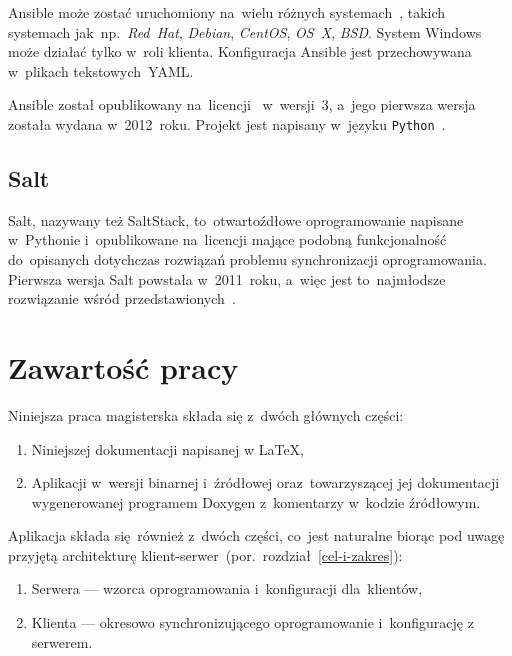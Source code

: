\documentclass[thesis]{subfiles}
\begin{document}
Ansible może zostać uruchomiony na~wielu różnych systemach~, takich systemach jak~np.~\emph{Red~Hat}, \emph{Debian}, \emph{CentOS}, \emph{OS~X}, \emph{BSD}. System Windows może działać tylko w~roli klienta. Konfiguracja Ansible jest przechowywana w~plikach tekstowych~YAML.

Ansible został opublikowany na~licencji~ w~wersji~3, a~jego pierwsza wersja została wydana w~2012~roku. Projekt jest napisany w~języku \texttt{Python}~\cite{ansible,ansible-github}.


\subsection{Salt}

Salt, nazywany też SaltStack, to~otwartoźdłowe oprogramowanie napisane w~Pythonie i~opublikowane na~licencji  mające podobną funkcjonalność do~opisanych dotychczas rozwiązań problemu synchronizacji oprogramowania. Pierwsza wersja Salt powstała w~2011~roku, a~więc jest to~najmłodsze rozwiązanie wśród przedstawionych~\cite{saltstack}.

%
%
%
%
%

\section{Zawartość pracy}

\noindent Niniejsza praca magisterska składa się z~dwóch głównych części:
\begin{enumerate}
	\item Niniejszej dokumentacji napisanej w \LaTeX,
	\item Aplikacji w~wersji binarnej i~źródłowej oraz~towarzyszącej jej dokumentacji wygenerowanej programem Doxygen z~komentarzy w~kodzie źródłowym.
\end{enumerate}
Aplikacja składa się~również z~dwóch części, co~jest naturalne biorąc pod uwagę przyjętą architekturę klient-serwer~(por.~rozdział~\ref{cel-i-zakres}):
\begin{enumerate}
	\item Serwera --- wzorca oprogramowania i~konfiguracji dla~klientów,
	\item Klienta --- okresowo synchronizującego oprogramowanie i~konfigurację z serwerem.
\end{enumerate}
\end{document}
